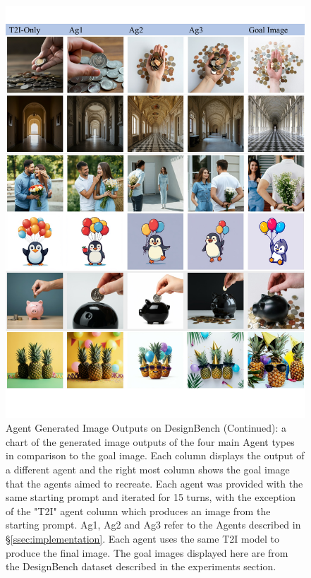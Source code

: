 \begin{figure}
    \centering
    \includegraphics[width=\linewidth]{figures/toy_data_chart_part2.pdf}
    \caption{Agent Generated Image Outputs on DesignBench (Continued): a chart of the generated image outputs of the four main Agent types in comparison to the goal image. Each column displays the output of a different agent and the right most column shows the goal image that the agents aimed to recreate. Each agent was provided with the same starting prompt and iterated for 15 turns, with the exception of the "T2I" agent column which produces an image from the starting prompt. Ag1, Ag2 and Ag3 refer to the Agents described in \S \ref{ssec:implementation}. Each agent uses the same T2I model to produce the final image. The goal images displayed here are from the DesignBench dataset described in the experiments section.}
    \label{fig:toy2}
\end{figure}

